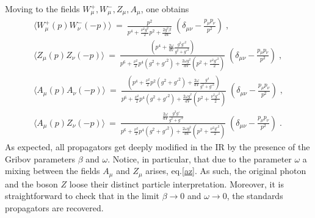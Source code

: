 Moving to the fields $W^{+}_\mu, W^{-}_\mu, Z_\mu, A_\mu$, one obtains 
\begin{subequations} \label{propszandgamma} \begin{gather}
\langle  W^{+}_\mu(p) W^{-}_\nu(-p) \rangle ~=~ \frac{p^2}{p^4 + \frac{\nu^2g^2}{2} p^2 + \frac{2g^2\beta}{dV} } \;  \left( \delta_{\mu\nu} - \frac{p_\mu p_\nu}{p^2} \right)  \;,   \label{ww}
\\
\langle  Z_\mu(p) Z_\nu(-p) \rangle ~=~ \frac{\left( p^4 +\frac{2\omega}{dV} \frac{g^2 g'^2}{g^2+g'^2}  \right)}{p^6 + \frac{\nu^2}{2} p^4 \left(g^2 +g'^2 \right)  + \frac{2\omega g^2}{dV} \left( p^2 + \frac{\nu^2 g'^2}{2} \right) } \;  \left( \delta_{\mu\nu} - \frac{p_\mu p_\nu}{p^2} \right)  \;,   \label{zz}
\\
\langle  A_\mu(p) A_\nu(-p) \rangle ~=~ \frac{\left( p^4 +\frac{\nu^2}{2} p^2 (g^2+g'^2) +\frac{2\omega}{dV} \frac{g^4}{g^2+g'^2}\right)}{p^6 + \frac{\nu^2}{2} p^4 \left(g^2 +g'^2 \right)  + \frac{2\omega g^2}{dV} \left( p^2 + \frac{\nu^2 g'^2}{2} \right) } \;  \left( \delta_{\mu\nu} - \frac{p_\mu p_\nu}{p^2} \right)  \;,   \label{aa}
\\
\langle  A_\mu(p) Z_\nu(-p) \rangle ~=~ \frac{\frac{2\omega}{dV} \frac{g^3 g'}{g^2+g'^2} }{p^6 + \frac{\nu^2}{2} p^4 \left(g^2 +g'^2 \right)  + \frac{2\omega g^2}{dV} \left( p^2 + \frac{\nu^2 g'^2}{2} \right)} \;  \left( \delta_{\mu\nu} - \frac{p_\mu p_\nu}{p^2} \right)  \;.   \label{az}
\end{gather} \end{subequations}
As expected, all propagators get deeply modified in the IR by the presence of the Gribov parameters $\beta$ and $\omega$. Notice, in particular, that due to the parameter $\omega$ a mixing between the fields $A_\mu$ and $Z_\mu$ arises, eq.\eqref{az}. As such, the original photon and the boson $Z$ loose their distinct particle interpretation.  Moreover, it is straightforward to check that in the limit $\beta \rightarrow 0$ and $\omega \rightarrow 0$, the standards propagators are recovered.

